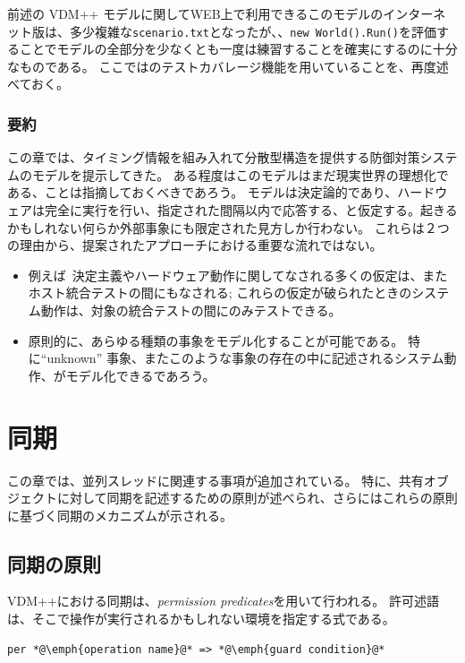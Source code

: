 \documentclass[\pformat,12pt]{jreport}
\begin{document}
前述の VDM++ モデルに関してWEB上で利用できるこのモデルのインターネット版は、多少複雑な\texttt{scenario.txt}となったが、、\texttt{new World().Run()}を評価することでモデルの全部分を少なくとも一度は練習することを確実にするのに十分なものである。
ここでは\VDMTools のテストカバレージ機能を用いていることを、再度述べておく。

\subsection{要約}

この章では、タイミング情報を組み入れて分散型構造を提供する防御対策システムのモデルを提示してきた。
ある程度はこのモデルはまだ現実世界の理想化である、ことは指摘しておくべきであろう。
モデルは決定論的であり、ハードウェアは完全に実行を行い、指定された間隔以内で応答する、と仮定する。起きるかもしれない何らか外部事象にも限定された見方しか行わない。 
これらは２つの理由から、提案されたアプローチにおける重要な流れではない。

\begin{itemize}
\item 例えば\ 決定主義やハードウェア動作に関してなされる多くの仮定は、またホスト統合テストの間にもなされる;
これらの仮定が破られたときのシステム動作は、対象の統合テストの間にのみテストできる。
\item 
原則的に、あらゆる種類の事象をモデル化することが可能である。
特に``unknown'' 事象、またこのような事象の存在の中に記述されるシステム動作、がモデル化できるであろう。
\end{itemize}

\chapter{同期}\label{chap:sync}

この章では、並列スレッドに関連する事項が追加されている。
特に、共有オブジェクトに対して同期を記述するための原則が述べられ、さらにはこれらの原則に基づく同期のメカニズムが示される。

\section{同期の原則}

VDM++における同期は、\emph{permission predicates}を用いて行われる。
許可述語は、そこで操作が実行されるかもしれない環境を指定する式である。

\begin{lstlisting}
per *@\emph{operation name}@* => *@\emph{guard condition}@*
\end{lstlisting}
\end{document}
